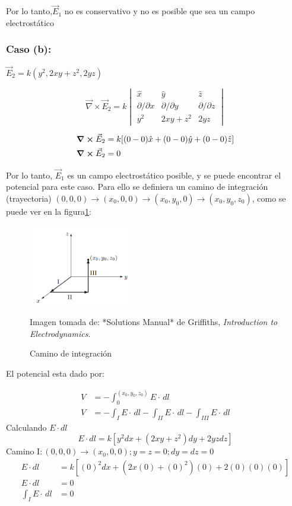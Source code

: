 \documentclass{article}
\begin{document}
Por lo tanto,$\vec{E}_{1}$ no es conservativo y no es posible que sea un campo electrostático
\subsubsection*{Caso (b):}

$\vec{E}_{2} = k(y^2, 2xy+z^2, 2yz)$

\[
\vec{\nabla} \times \vec{E}_{2} = k
\begin{vmatrix}
\hat{x} & \hat{y} & \hat{z} \\
\partial/\partial x & \partial/\partial y & \partial/\partial z \\
y^2 & 2xy+z^2 & 2yz
\end{vmatrix}
\]

\begin{align*}
  \curl{\vec{E}_{2}} &= k [(0-0)\hat{x} + (0-0)\hat{y} + (0-0)\hat{z}] \\
  \curl{\vec{E}_{2}} &= 0
\end{align*}

Por lo tanto, $\vec{E}_{1}$ es un campo electrostático posible, y se puede encontrar el potencial para este caso.
\newpage
Para ello se definiera un camino de integración (trayectoria) $(0,0,0) \rightarrow (x_{0},0,0) \rightarrow (x_{0},y_{0},0) \rightarrow (x_{0},y_{0},z_{0})$, 
como se puede ver en la figura\ref{Camino_de_integracion}:


\begin{figure}[h]
  \centering
  \includegraphics[width=0.4\textwidth]{imagenes/path1.png}
  \caption{\label{Camino_de_integracion}Camino de integración}
  \small Imagen tomada de: *Solutions Manual* de Griffiths, \textit{Introduction to Electrodynamics}.
\end{figure}
El potencial esta dado por:

\begin{align*}
  V &= - \int_{0}^{(x_{0},y_{0},z_{0})} E\cdot\,dl \\
  V &= - \int_{I}^{} E\cdot\,dl - \int_{II}^{} E\cdot\,dl - \int_{III}^{} E\cdot\,dl
\end{align*}
Calculando $E \cdot dl$
\[
  E \cdot dl = k[y^2 dx + (2xy+z^2)dy + 2yz dz]
\]
Camino I$: (0,0,0) \rightarrow (x_{0},0,0); y=z=0 ; dy=dz=0$
\begin{align*}
  E \cdot dl &= k[{(0)}^2 dx + (2x(0)+{(0)}^2)(0) + 2(0)(0)(0)] \\
  E \cdot dl &= 0 \\
  \int_{I}^{} E\cdot\,dl &= 0
\end{align*}
\end{document}
